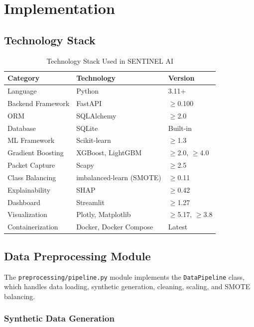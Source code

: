 \chapter{Implementation}

\section{Technology Stack}

\begin{table}[H]
\centering
\caption{Technology Stack Used in SENTINEL AI}
\label{tab:tech_stack}
\begin{tabular}{l l l}
\toprule
\textbf{Category} & \textbf{Technology} & \textbf{Version} \\
\midrule
Language & Python & 3.11+ \\
Backend Framework & FastAPI & $\geq$0.100 \\
ORM & SQLAlchemy & $\geq$2.0 \\
Database & SQLite & Built-in \\
ML Framework & Scikit-learn & $\geq$1.3 \\
Gradient Boosting & XGBoost, LightGBM & $\geq$2.0, $\geq$4.0 \\
Packet Capture & Scapy & $\geq$2.5 \\
Class Balancing & imbalanced-learn (SMOTE) & $\geq$0.11 \\
Explainability & SHAP & $\geq$0.42 \\
Dashboard & Streamlit & $\geq$1.27 \\
Visualization & Plotly, Matplotlib & $\geq$5.17, $\geq$3.8 \\
Containerization & Docker, Docker Compose & Latest \\
\bottomrule
\end{tabular}
\end{table}

\section{Data Preprocessing Module}

The \texttt{preprocessing/pipeline.py} module implements the \texttt{DataPipeline} class, which handles data loading, synthetic generation, cleaning, scaling, and SMOTE balancing.

\subsection{Synthetic Data Generation}

